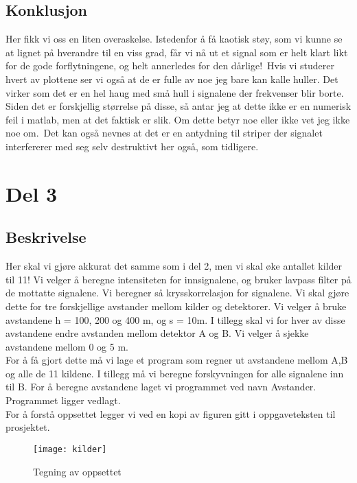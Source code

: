 \documentclass[12pt,norsk,a4paper]{article}
\begin{document}
\subsection{Konklusjon}

Her fikk vi oss en liten overaskelse. Istedenfor å få kaotisk støy, som vi kunne se at lignet på hverandre til en viss grad, får vi nå ut et signal som er helt klart likt for de gode forflytningene, og helt annerledes for den dårlige!\
Hvis vi studerer hvert av plottene ser vi også at de er fulle av noe jeg bare kan kalle huller. Det virker som det er en hel haug med små hull i signalene der frekvenser blir borte. Siden det er forskjellig størrelse på disse, så antar jeg at dette ikke er en numerisk feil i matlab, men at det faktisk er slik. Om dette betyr noe eller ikke vet jeg ikke noe om.\
Det kan også nevnes at det er en antydning til striper der signalet interfererer med seg selv destruktivt her også, som tidligere.

\section{Del 3}
\subsection{Beskrivelse}

Her skal vi gjøre akkurat det samme som i del 2, men vi skal øke antallet kilder til 11! Vi velger å beregne intensiteten for innsignalene, og bruker lavpass filter på de mottatte signalene. Vi beregner så krysskorrelasjon for signalene. Vi skal gjøre dette for tre forskjellige avstander mellom kilder og detektorer. 
Vi velger å bruke avstandene h = 100, 200 og 400 m, og s = 10m. I tillegg skal vi for hver av disse avstandene endre avstanden mellom detektor A og B. Vi velger å sjekke avstandene mellom 0 og 5 m. \\
For å få gjort dette må vi lage et program som regner ut avstandene mellom A,B og alle de 11 kildene. I tillegg må vi beregne forskyvningen for alle signalene inn til B.
For å beregne avstandene laget vi programmet ved navn Avstander. Programmet ligger vedlagt.\\
For å forstå oppsettet legger vi ved en kopi av figuren gitt i oppgaveteksten til prosjektet.
\begin{figure}[H]
\begin{center}
\texttt{[image: kilder]}
\caption[caption]{Tegning av oppsettet} 
\end{center}
\end{figure}
\end{document}
